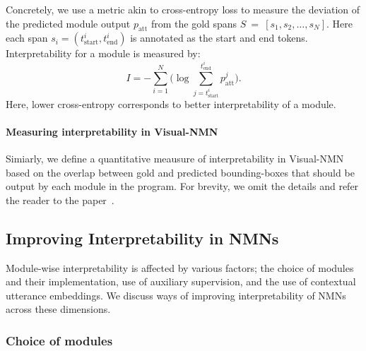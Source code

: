 \documentclass[main.tex]{subfiles}
\begin{document}
Concretely, we use a metric akin to cross-entropy loss to measure the deviation of the predicted module output $p_{\text{att}}$ from the gold spans  $S~=~[s_{1}, s_{2}, \ldots, s_{N}]$. Here each span $s_{i} = (t^{i}_{\text{start}}, t^{i}_{\text{end}})$ is annotated as the start and end tokens.
Interpretability for a module is measured by:
\begin{equation*}
    I = - \sum_{i=1}^{N}  \Bigg(\log \sum_{j = t^{i}_{\text{start}}}^{t^{i}_{\text{end}}} p_{\text{att}}^{j} \Bigg).
\end{equation*}
Here, lower cross-entropy corresponds to better interpretability of a module.

\paragraph{Measuring interpretability in Visual-NMN}
Simiarly, we define a quantitative meausure of interpretability in Visual-NMN based on the overlap between gold and predicted bounding-boxes that should be output by each module in the program. For brevity, we omit the details and refer the reader to the paper~\missingcite{}.


\subsection{Improving Interpretability in NMNs}
\label{ssec:interpret}
Module-wise interpretability is affected by various factors; the choice of modules and their implementation, use of auxiliary supervision, and the use of contextual utterance embeddings. We discuss ways of improving interpretability of NMNs across these dimensions.

\subsubsection{Choice of modules}



\biblio
\end{document}
